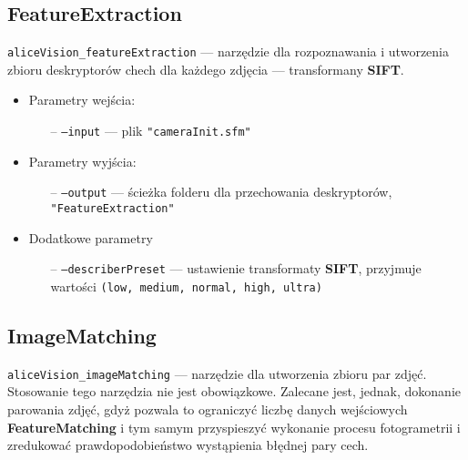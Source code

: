 \subsection{FeatureExtraction}

\texttt{aliceVision\_featureExtraction} --- narzędzie dla rozpoznawania i utworzenia zbioru deskryptorów chech dla każdego zdjęcia --- transformany \textbf{SIFT}.

\begin{itemize}
   \item Parametry wejścia:
   \begin{itemize}
      \item[--] \texttt{--input} --- plik \texttt{"cameraInit.sfm"}
   \end{itemize}

   \item Parametry wyjścia:
   \begin{itemize}
      \item[--] \texttt{--output} --- ścieżka folderu dla przechowania deskryptorów, \texttt{"FeatureExtraction"}
   \end{itemize}

   \item Dodatkowe parametry
   \begin{itemize}
      \item[--] \texttt{--describerPreset} --- ustawienie transformaty \textbf{SIFT}, przyjmuje wartości \texttt{(low, medium, normal, high, ultra)}
   \end{itemize}
\end{itemize}

\subsection{ImageMatching}

\texttt{aliceVision\_imageMatching} --- narzędzie dla utworzenia zbioru par zdjęć.
Stosowanie tego narzędzia nie jest obowiązkowe.
Zalecane jest, jednak, dokonanie parowania zdjęć, gdyż pozwala to ograniczyć liczbę danych wejściowych \textbf{FeatureMatching} i tym samym przyspieszyć wykonanie procesu fotogrametrii i zredukować prawdopodobieństwo wystąpienia błędnej pary cech.

